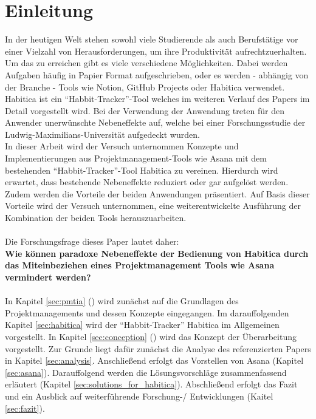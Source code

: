 \documentclass[sigconf, nonacm]{acmart}
\begin{document}
\section{Einleitung}
In der heutigen Welt stehen sowohl viele Studierende als auch Berufstätige vor einer Vielzahl von Herausforderungen, um ihre Produktivität aufrechtzuerhalten. Um das zu erreichen gibt es viele verschiedene Möglichkeiten. Dabei werden Aufgaben häufig in Papier Format aufgeschrieben, oder es werden - abhängig von der Branche - Tools wie Notion, GitHub Projects oder Habitica verwendet.
Habitica ist ein \enquote{Habbit-Tracker}-Tool welches im weiteren Verlauf des Papers im Detail vorgestellt wird. Bei der Verwendung der Anwendung treten für den Anwender unerwünschte Nebeneffekte auf, welche bei einer Forschungsstudie der Ludwig-Maximilians-Universität aufgedeckt wurden. \\
In dieser Arbeit wird der Versuch unternommen Konzepte und Implementierungen aus Projektmanagement-Tools wie Asana mit dem bestehenden \enquote{Habbit-Tracker}-Tool Habitica zu vereinen. Hierdurch wird erwartet, dass bestehende Nebeneffekte reduziert oder gar aufgelöst werden. Zudem werden die Vorteile der beiden Anwendungen präsentiert. Auf Basis dieser Vorteile wird der Versuch unternommen, eine weiterentwickelte Ausführung der Kombination der beiden Tools herauszuarbeiten.
\\
\\
Die Forschungsfrage dieses Paper lautet daher:\\
\textbf{Wie können paradoxe Nebeneffekte der Bedienung \allowbreak von Habitica durch das Miteinbeziehen eines Projektmanagement Tools wie Asana vermindert werden?}
\\
\\
In Kapitel \ref{sec:pmtia} () wird zunächst auf die Grundlagen des Projektmanagements und dessen Konzepte eingegangen. Im darauffolgenden Kapitel \ref{sec:habitica} wird der \enquote{Habbit-Tracker} Habitica im Allgemeinen vorgestellt. In Kapitel \ref{sec:conception} () wird das Konzept der Überarbeitung vorgestellt. Zur Grunde liegt dafür zunächst die Analyse des referenzierten Papers in Kapitel \ref{sec:analysis}. Anschließend erfolgt das Vorstellen von Asana (Kapitel \ref{sec:asana}). Darauffolgend werden die Lösungsvorschläge zusammenfassend erläutert (Kapitel \ref{sec:solutions_for_habitica}). Abschließend erfolgt das Fazit und ein Ausblick auf weiterführende Forschung-/ Entwicklungen (Kaitel \ref{sec:fazit}).
\end{document}
